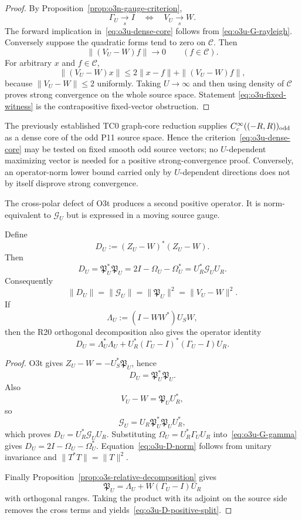 \begin{proof}
By Proposition~\ref{prop:o3n-gauge-criterion},
\[
 \Gamma_U\xrightarrow[s]{}I
 \quad\Longleftrightarrow\quad
 V_U\xrightarrow[s]{}W.
\]
The forward implication in~\eqref{eq:o3u-dense-core} follows from
\eqref{eq:o3u-G-rayleigh}.  Conversely suppose the quadratic forms tend to zero on
$\mathcal C$.  Then
\[
 \|(V_U-W)f\|\to0
 \qquad(f\in\mathcal C).
\]
For arbitrary $x$ and $f\in\mathcal C$,
\[
 \|(V_U-W)x\|
 \le2\|x-f\|+\|(V_U-W)f\|,
\]
because $\|V_U-W\|\le2$ uniformly.  Taking $U\to\infty$ and then using density of
$\mathcal C$ proves strong convergence on the whole source space.  Statement
\eqref{eq:o3u-fixed-witness} is the contrapositive fixed-vector obstruction.
\end{proof}

\begin{remark}
\label{rem:o3u-smooth-core}
The previously established TC0 graph-core reduction supplies
$C_c^\infty((-R,R))_{\rm odd}$ as a dense core of the odd P11 source space.  Hence the
criterion~\eqref{eq:o3u-dense-core} may be tested on fixed smooth odd source vectors;
no $U$-dependent maximizing vector is needed for a positive strong-convergence proof.
Conversely, an operator-norm lower bound carried only by $U$-dependent directions does
not by itself disprove strong convergence.
\end{remark}

The cross-polar defect of O3t produces a second positive operator.  It is norm-equivalent
to $\mathscr G_U$ but is expressed in a moving source gauge.

\begin{proposition}
\label{prop:o3u-moving-angle}
Define
\[
 \boxed{
 D_U:=(Z_U-W)^*(Z_U-W).
 }
\tag{O3U.7}\label{eq:o3u-D-def}
\]
Then
\[
 \boxed{
 D_U=\mathfrak P_U^*\mathfrak P_U
 =2I-\Omega_U-\Omega_U^*
 =U_R^*\mathscr G_UU_R.
 }
\tag{O3U.8}\label{eq:o3u-D-identities}
\]
Consequently
\[
 \boxed{
 \|D_U\|
 =\|\mathscr G_U\|
 =\|\mathfrak P_U\|^2
 =\|V_U-W\|^2.
 }
\tag{O3U.9}\label{eq:o3u-D-norm}
\]
If
\[
 \Lambda_U:=(I-WW^*)U_SW,
\]
then the R20 orthogonal decomposition also gives the operator identity
\[
 \boxed{
 D_U
 =\Lambda_U^*\Lambda_U
 +U_R^*(\Gamma_U-I)^*(\Gamma_U-I)U_R.
 }
\tag{O3U.10}\label{eq:o3u-D-positive-split}
\]
\end{proposition}

\begin{proof}
O3t gives $Z_U-W=-U_S^*\mathfrak P_U$, hence
\[
 D_U=\mathfrak P_U^*\mathfrak P_U.
\]
Also
\[
 V_U-W=\mathfrak P_UU_R^*,
\]
so
\[
 \mathscr G_U
 =U_R\mathfrak P_U^*\mathfrak P_UU_R^*,
\]
which proves $D_U=U_R^*\mathscr G_UU_R$.  Substituting
$\Omega_U=U_R^*\Gamma_UU_R$ into~\eqref{eq:o3u-G-gamma} gives
$D_U=2I-\Omega_U-\Omega_U^*$.  Equation~\eqref{eq:o3u-D-norm} follows from unitary
invariance and
$\|T^*T\|=\|T\|^2$.

Finally Proposition~\ref{prop:o3s-relative-decomposition} gives
\[
 \mathfrak P_U
 =\Lambda_U+W(\Gamma_U-I)U_R
\]
with orthogonal ranges.  Taking the product with its adjoint on the source side removes
the cross terms and yields~\eqref{eq:o3u-D-positive-split}.
\end{proof}

